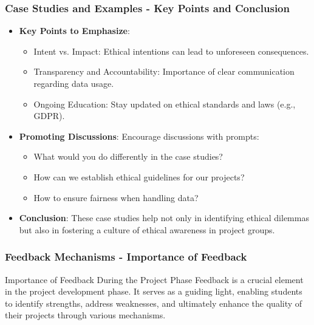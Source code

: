 \documentclass[aspectratio=169]{beamer}
\begin{document}
\begin{frame}[fragile]
    \frametitle{Case Studies and Examples - Key Points and Conclusion}
    \begin{itemize}
        \item \textbf{Key Points to Emphasize}:
        \begin{itemize}
            \item Intent vs. Impact: Ethical intentions can lead to unforeseen consequences.
            \item Transparency and Accountability: Importance of clear communication regarding data usage.
            \item Ongoing Education: Stay updated on ethical standards and laws (e.g., GDPR).
        \end{itemize}

        \item \textbf{Promoting Discussions}:
        Encourage discussions with prompts:
        \begin{itemize}
            \item What would you do differently in the case studies?
            \item How can we establish ethical guidelines for our projects?
            \item How to ensure fairness when handling data?
        \end{itemize}

        \item \textbf{Conclusion}: These case studies help not only in identifying ethical dilemmas but also in fostering a culture of ethical awareness in project groups.
    \end{itemize}
\end{frame}

\begin{frame}[fragile]
    \frametitle{Feedback Mechanisms - Importance of Feedback}
    \begin{block}{Importance of Feedback During the Project Phase}
        Feedback is a crucial element in the project development phase. It serves as a guiding light, enabling students to identify strengths, address weaknesses, and ultimately enhance the quality of their projects through various mechanisms.
    \end{block}
\end{frame}
\end{document}
